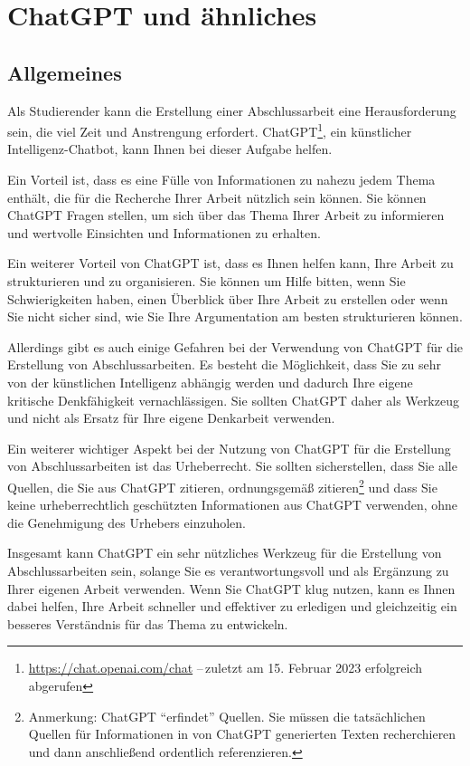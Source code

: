 \chapter{ChatGPT und ähnliches}\label{apdx:ChatGPT}
\section{Allgemeines}\label{apdx:sect:General}
Als Studierender kann die Erstellung einer Abschlussarbeit eine Herausforderung sein, die viel Zeit und Anstrengung erfordert. ChatGPT\footnote{\url{https://chat.openai.com/chat} --\,zuletzt am 15. Februar 2023 erfolgreich abgerufen}, ein künstlicher Intelligenz-Chatbot, kann Ihnen bei dieser Aufgabe helfen.

Ein Vorteil ist, dass es eine Fülle von Informationen zu nahezu jedem Thema enthält, die für die Recherche Ihrer Arbeit nützlich sein können. Sie können ChatGPT Fragen stellen, um sich über das Thema Ihrer Arbeit zu informieren und wertvolle Einsichten und Informationen zu erhalten.

Ein weiterer Vorteil von ChatGPT ist, dass es Ihnen helfen kann, Ihre Arbeit zu strukturieren und zu organisieren. Sie können um Hilfe bitten, wenn Sie Schwierigkeiten haben, einen Überblick über Ihre Arbeit zu erstellen oder wenn Sie nicht sicher sind, wie Sie Ihre Argumentation am besten strukturieren können.

Allerdings gibt es auch einige Gefahren bei der Verwendung von ChatGPT für die Erstellung von Abschlussarbeiten. Es besteht die Möglichkeit, dass Sie zu sehr von der künstlichen Intelligenz abhängig werden und dadurch Ihre eigene kritische Denkfähigkeit vernachlässigen. Sie sollten ChatGPT daher als Werkzeug und nicht als Ersatz für Ihre eigene Denkarbeit verwenden.

Ein weiterer wichtiger Aspekt bei der Nutzung von ChatGPT für die Erstellung von Abschlussarbeiten ist das Urheberrecht. Sie sollten sicherstellen, dass Sie alle Quellen, die Sie aus ChatGPT zitieren, ordnungsgemäß zitieren\footnote{Anmerkung: ChatGPT \enquote{erfindet} Quellen. Sie müssen die tatsächlichen Quellen für Informationen in von ChatGPT generierten Texten recherchieren und dann anschließend ordentlich referenzieren.} und dass Sie keine urheberrechtlich geschützten Informationen aus ChatGPT verwenden, ohne die Genehmigung des Urhebers einzuholen.

Insgesamt kann ChatGPT ein sehr nützliches Werkzeug für die Erstellung von Abschlussarbeiten sein, solange Sie es verantwortungsvoll und als Ergänzung zu Ihrer eigenen Arbeit verwenden. Wenn Sie ChatGPT klug nutzen, kann es Ihnen dabei helfen, Ihre Arbeit schneller und effektiver zu erledigen und gleichzeitig ein besseres Verständnis für das Thema zu entwickeln.

